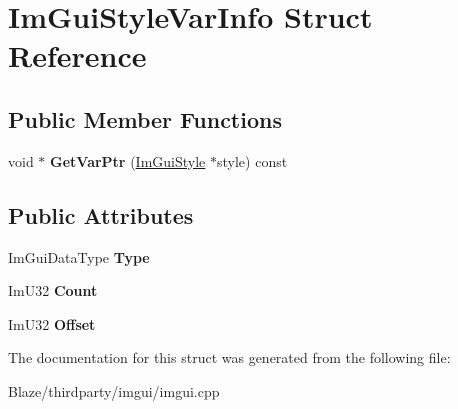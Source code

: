 \hypertarget{structImGuiStyleVarInfo}{}\section{Im\+Gui\+Style\+Var\+Info Struct Reference}
\label{structImGuiStyleVarInfo}
\subsection*{Public Member Functions}
\begin{DoxyCompactItemize}
\item 
\mbox{\label{structImGuiStyleVarInfo_a92aebc5f0d8b2b43b61dbcaf992b5643}} 
void $\ast$ {\bfseries Get\+Var\+Ptr} (\hyperlink{structImGuiStyle}{Im\+Gui\+Style} $\ast$style) const
\end{DoxyCompactItemize}
\subsection*{Public Attributes}
\begin{DoxyCompactItemize}
\item 
\mbox{\label{structImGuiStyleVarInfo_a62f42d2bb7b71b7530493e16e622cb81}} 
Im\+Gui\+Data\+Type {\bfseries Type}
\item 
\mbox{\label{structImGuiStyleVarInfo_acfab57d23ba575db3595da80989b444e}} 
Im\+U32 {\bfseries Count}
\item 
\mbox{\label{structImGuiStyleVarInfo_ae900d6a02166d3d0433c18b95aec10e8}} 
Im\+U32 {\bfseries Offset}
\end{DoxyCompactItemize}


The documentation for this struct was generated from the following file\+:\begin{DoxyCompactItemize}
\item 
Blaze/thirdparty/imgui/imgui.\+cpp\end{DoxyCompactItemize}
